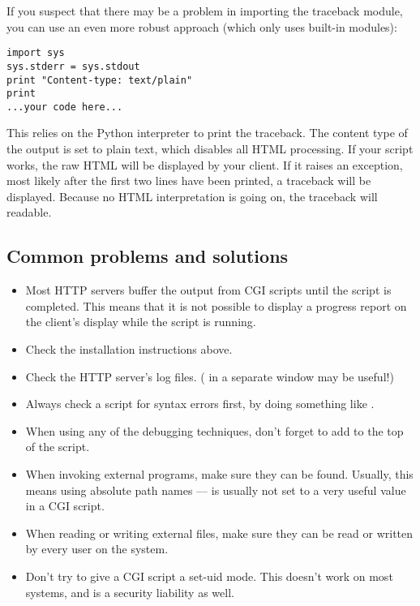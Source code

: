 If you suspect that there may be a problem in importing the traceback
module, you can use an even more robust approach (which only uses
built-in modules):

\begin{verbatim}
import sys
sys.stderr = sys.stdout
print "Content-type: text/plain"
print
...your code here...
\end{verbatim}

This relies on the Python interpreter to print the traceback.  The
content type of the output is set to plain text, which disables all
HTML processing.  If your script works, the raw HTML will be displayed
by your client.  If it raises an exception, most likely after the
first two lines have been printed, a traceback will be displayed.
Because no HTML interpretation is going on, the traceback will
readable.


\subsection{Common problems and solutions}

\begin{itemize}
\item Most HTTP servers buffer the output from CGI scripts until the
script is completed.  This means that it is not possible to display a
progress report on the client's display while the script is running.

\item Check the installation instructions above.

\item Check the HTTP server's log files.  ( in a
separate window may be useful!)

\item Always check a script for syntax errors first, by doing something
like .

\item When using any of the debugging techniques, don't forget to add
 to the top of the script.

\item When invoking external programs, make sure they can be found.
Usually, this means using absolute path names ---  is
usually not set to a very useful value in a CGI script.

\item When reading or writing external files, make sure they can be read
or written by every user on the system.

\item Don't try to give a CGI script a set-uid mode.  This doesn't work on
most systems, and is a security liability as well.
\end{itemize}

